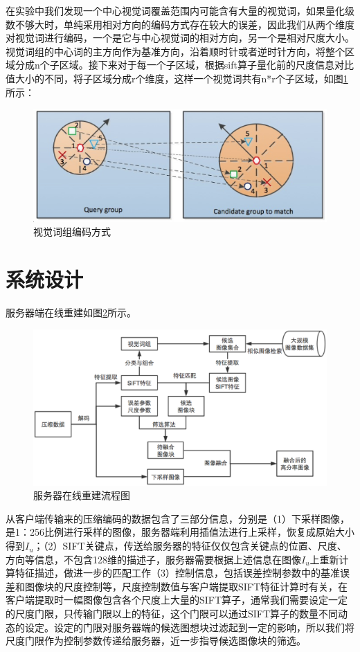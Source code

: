 \documentclass[UTF8]{csoarticle}
\begin{document}
在实验中我们发现一个中心视觉词覆盖范围内可能含有大量的视觉词，如果量化级数不够大时，单纯采用相对方向的编码方式存在较大的误差，因此我们从两个维度对视觉词进行编码，一个是它与中心视觉词的相对方向，另一个是相对尺度大小。视觉词组的中心词的主方向作为基准方向，沿着顺时针或者逆时针方向，将整个区域分成n个子区域。接下来对于每一个子区域，根据sift算子量化前的尺度信息对比值大小的不同，将子区域分成r个维度，这样一个视觉词共有n*r个子区域，如图\ref{fig:visual}所示：

\begin{figure}
\centering\includegraphics[width=12cm]{visual_group}
\caption{视觉词组编码方式}
\label{fig:visual}
\end{figure}


\section{系统设计}

服务器端在线重建如图\ref{fig:serverOnline}所示。
\begin{figure}
\centering\includegraphics[width=15cm]{serverOnline}
\caption{服务器在线重建流程图}
\label{fig:serverOnline}
\end{figure}

从客户端传输来的压缩编码的数据包含了三部分信息，分别是（1）下采样图像，是1：256比例进行采样的图像，服务器端利用插值法进行上采样，恢复成原始大小得到\(I_u\)；（2）SIFT关键点，传送给服务器的特征仅仅包含关键点的位置、尺度、方向等信息，不包含128维的描述子，服务器需要根据上述信息在图像\(I_u\)上重新计算特征描述，做进一步的匹配工作（3）控制信息，包括误差控制参数中的基准误差和图像块的尺度控制等，尺度控制数值与客户端提取SIFT特征计算时有关，在客户端提取时一幅图像包含各个尺度上大量的SIFT算子，通常我们需要设定一定的尺度门限，只传输门限以上的特征，这个门限可以通过SIFT算子的数量不同动态的设定。设定的门限对服务器端的候选图想块过滤起到一定的影响，所以我们将尺度门限作为控制参数传递给服务器，近一步指导候选图像块的筛选。
\end{document}
